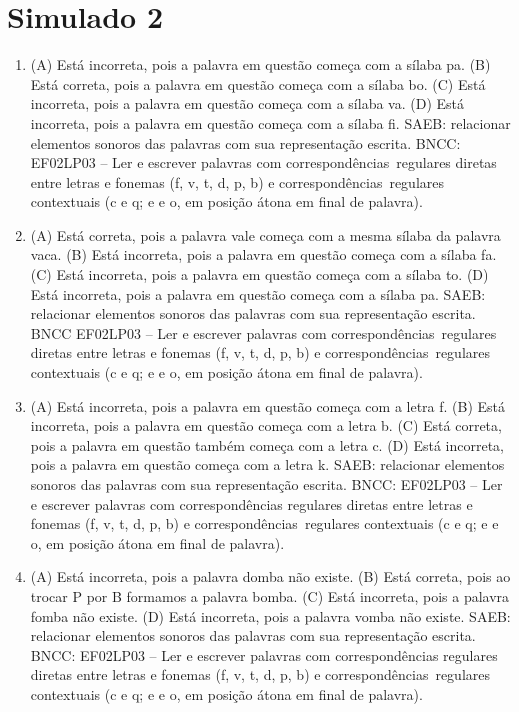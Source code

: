 \section*{Simulado 2}

\begin{enumerate}
\item
(A) Está incorreta, pois a palavra em questão começa com a sílaba pa.
(B) Está correta, pois a palavra em questão começa com a sílaba bo.
(C) Está incorreta, pois a palavra em questão começa com a sílaba va.
(D) Está incorreta, pois a palavra em questão começa com a sílaba fi.
SAEB: relacionar elementos sonoros das palavras com sua representação escrita.
BNCC: EF02LP03 -- Ler e escrever palavras com correspondências~regulares
diretas entre letras e fonemas (f, v, t, d, p, b) e correspondências~regulares contextuais (c e q; e e o, em posição átona em final de palavra).

\item
(A) Está correta, pois a palavra vale começa com a mesma sílaba da palavra vaca.
(B) Está incorreta, pois a palavra em questão começa com a sílaba fa.
(C) Está incorreta, pois a palavra em questão começa com a sílaba to.
(D) Está incorreta, pois a palavra em questão começa com a sílaba pa.
SAEB: relacionar elementos sonoros das palavras com sua representação escrita.
BNCC EF02LP03 -- Ler e escrever palavras com correspondências~regulares
diretas entre letras e fonemas (f, v, t, d, p, b) e correspondências~regulares contextuais (c e q; e e o, em posição átona em final de palavra).

\item
(A) Está incorreta, pois a palavra em questão começa com a letra f.
(B) Está incorreta, pois a palavra em questão começa com a letra b.
(C) Está correta, pois a palavra em questão também começa com a letra c.
(D) Está incorreta, pois a palavra em questão começa com a letra k.
SAEB: relacionar elementos sonoros das palavras com sua representação escrita.
BNCC: EF02LP03 -- Ler e escrever palavras com correspondências
regulares diretas entre letras e fonemas (f, v, t, d, p, b) e
correspondências~regulares contextuais (c e q; e e o, em posição átona
em final de palavra).

\item
(A) Está incorreta, pois a palavra domba não existe.
(B) Está correta, pois ao trocar P por B formamos a palavra bomba.
(C) Está incorreta, pois a palavra fomba não existe.
(D) Está incorreta, pois a palavra vomba não existe.
SAEB: relacionar elementos sonoros das palavras com sua representação escrita.
BNCC: EF02LP03 -- Ler e escrever palavras com correspondências
regulares diretas entre letras e fonemas (f, v, t, d, p, b) e
correspondências~regulares contextuais (c e q; e e o, em posição átona
em final de palavra).


\end{enumerate}
